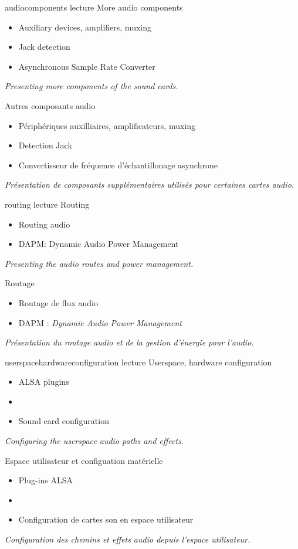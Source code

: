 {audiocomponents}
{lecture}
{More audio components}
{
  \begin{itemize}
  \item Auxiliary devices, amplifiers, muxing
  \item Jack detection
  \item Asynchronous Sample Rate Converter
  \end{itemize}
  \vspace{0.5em}
  {\em Presenting more components of the sound cards.}
}
{Autres composants audio}
{
  \begin{itemize}
  \item Périphériques auxilliaires, amplificateurs, muxing
  \item Detection Jack
  \item Convertisseur de fréquence d'échantillonage asynchrone
  \end{itemize}
  \vspace{0.5em}
  {\em Présentation de composants supplémentaires utilisés pour certaines cartes audio.}
}
{routing}
{lecture}
{Routing}
{
  \begin{itemize}
  \item Routing audio
  \item DAPM: Dynamic Audio Power Management
  \end{itemize}
  \vspace{0.5em}
  {\em Presenting the audio routes and power management.}
}
{Routage}
{
  \begin{itemize}
  \item Routage de flux audio
  \item DAPM : {\em Dynamic Audio Power Management}
  \end{itemize}
  \vspace{0.5em}
  {\em Présentation du routage audio et de la gestion d'énergie pour l'audio.}
}
{userspacehardwareconfiguration}
{lecture}
{Userspace, hardware configuration}
{
  \begin{itemize}
  \item ALSA plugins
  \item {}
  \item Sound card configuration
  \end{itemize}
  \vspace{0.5em}
  {\em Configuring the userspace audio paths and effects.}
}
{Espace utilisateur et configuation matérielle}
{
  \begin{itemize}
  \item Plug-ins ALSA
  \item {}
  \item Configuration de cartes son en espace utilisateur
  \end{itemize}
  \vspace{0.5em}
  {\em Configuration des chemins et effets audio depuis l'espace utilisateur.}
}
